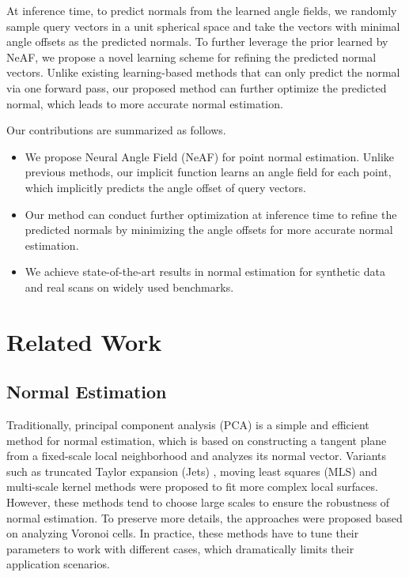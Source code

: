 \documentclass[letterpaper]{article} \usepackage{aaai23}  \usepackage{times}  \usepackage{helvet}  \usepackage{courier}  \usepackage[hyphens]{url}  \usepackage{graphicx} \urlstyle{rm} \def\UrlFont{\rm}  \usepackage{natbib}  \usepackage{caption} \frenchspacing  \setlength{\pdfpagewidth}{8.5in} \setlength{\pdfpageheight}{11in} \usepackage{algorithm}
\begin{document}
At inference time, to predict normals from the learned angle fields, we randomly sample query vectors in a unit spherical space and take the vectors with minimal angle offsets as the predicted normals. To further leverage the prior learned by NeAF, we propose a novel learning scheme for refining the predicted normal vectors. Unlike existing learning-based methods that can only predict the normal via one forward pass, our proposed method can further optimize the predicted normal, which leads to more accurate normal estimation. 

Our contributions are summarized as follows.
\begin{itemize}
\item We propose Neural Angle Field (NeAF) for point normal estimation. Unlike previous methods, our implicit function learns an angle field for each point, which implicitly predicts the angle offset of query vectors.
\item Our method can conduct further optimization at inference time to refine the predicted normals by minimizing the angle offsets for more accurate normal estimation.
\item We achieve state-of-the-art results in normal estimation for synthetic data and real scans on widely used benchmarks.

\end{itemize}

\section{Related Work}

\subsection{Normal Estimation}

Traditionally, principal component analysis (PCA) \cite{HoppeHugues1992SurfaceRF} is a simple and efficient method for normal estimation, which is based on constructing a tangent plane from a fixed-scale local neighborhood and analyzes its normal vector.  Variants such as truncated Taylor expansion (Jets) \cite{FrdricCazals2003EstimatingDQ}, moving least squares (MLS)  \cite{DavidLevin1998TheAP} and multi-scale kernel methods \cite{SamirAroudj2017VisibilityconsistentTS} were proposed to fit more complex local surfaces. However, these methods tend to choose large scales to ensure the robustness of normal estimation. To preserve more details, the approaches \cite{NinaAmenta1998SurfaceRB,QuentinMrigot2011VoronoiBasedCA} were proposed based on analyzing Voronoi cells. In practice, these methods have to tune their parameters to work with different cases, which dramatically limits their application scenarios.
\end{document}
